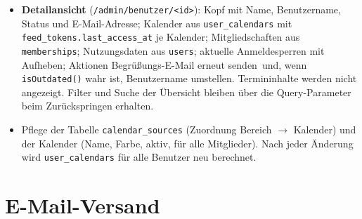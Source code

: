 \documentclass[a4paper,fontsize=10pt]{scrartcl}
\newcommand{\code}[1]{\texttt{#1}}
\begin{document}
\begin{itemize}
        Benutzername. Die Abfrage erfolgt über \code{users} mit
        Aggregationen über \code{feed\_tokens} und \code{user\_calendars};
        bei rund 200 Benutzern ist keine Paginierung nötig.
  \item \textbf{Detailansicht} (\code{/admin/benutzer/<id>}): Kopf mit Name,
        Benutzername, Status und E-Mail-Adresse; Kalender aus
        \code{user\_calendars} mit \code{feed\_tokens.last\_access\_at}
        je Kalender; Mitgliedschaften aus \code{memberships}; Nutzungsdaten
        aus \code{users}; aktuelle Anmeldesperren mit \glqq Aufheben\grqq;
        Aktionen \glqq Begrüßungs-E-Mail erneut
        senden\grqq\ und, wenn \code{isOutdated()} wahr ist,
        \glqq Benutzername umstellen\grqq. Termininhalte werden nicht
        angezeigt. Filter und Suche der Übersicht bleiben über die
        Query-Parameter beim Zurückspringen erhalten.
  \item Pflege der Tabelle \code{calendar\_sources} (Zuordnung Bereich
        $\rightarrow$ Kalender) und der Kalender (Name, Farbe, aktiv,
        \glqq für alle Mitglieder\grqq). Nach jeder Änderung wird
        \code{user\_calendars} für alle Benutzer neu berechnet.
\end{itemize}

\section{E-Mail-Versand}\label{sec:mail}
\end{document}

